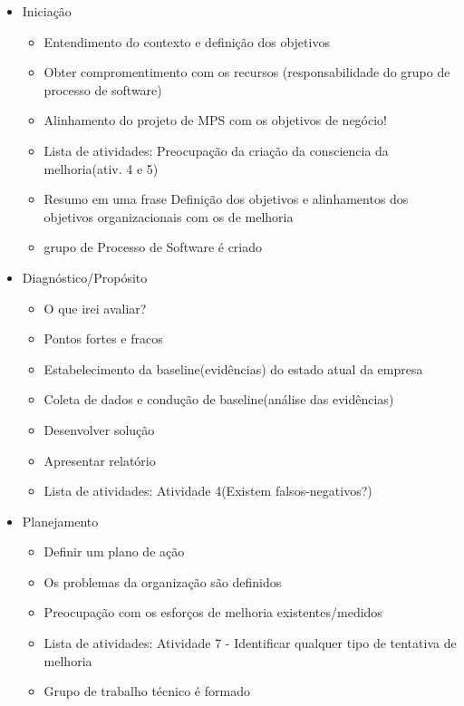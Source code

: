 \documentclass{article}
\begin{document}
\begin{itemize}
	\item Iniciação
		\begin{itemize}
		
		\item Entendimento do contexto e definição dos objetivos
		\item Obter compromentimento com os recursos (responsabilidade do grupo de processo de software)		
		\item Alinhamento do projeto de MPS com os objetivos de negócio!		
		\item Lista de atividades: Preocupação da criação da consciencia da melhoria(ativ. 4 e 5) 
		
		\item Resumo em uma frase Definição dos objetivos e alinhamentos dos objetivos organizacionais com os de melhoria	
		\item grupo de Processo de Software é criado	
		\end{itemize}				
	
	\item Diagnóstico/Propósito
		\begin{itemize}
		\item O que irei avaliar?
		\item Pontos fortes e fracos
		\item Estabelecimento da baseline(evidências) do estado atual da empresa
		\item Coleta de dados e condução de baseline(análise das evidências)
		\item Desenvolver solução
		\item Apresentar relatório		
		\item Lista de atividades: Atividade 4(Existem falsos-negativos?)
		
		\end{itemize}				
			
	\item Planejamento
		\begin{itemize}
		\item Definir um plano de ação
		\item Os problemas da organização são definidos		
		\item Preocupação com os esforços de melhoria existentes/medidos
		\item Lista de atividades: Atividade 7 - Identificar qualquer tipo de tentativa de melhoria
		\item Grupo de trabalho técnico é formado
		\end{itemize}
			

\end{itemize}
\end{document}
